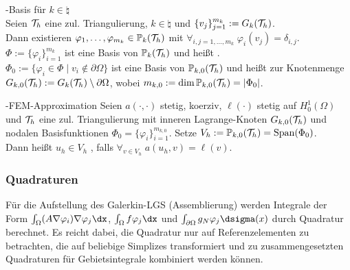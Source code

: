 \begin{Satz}{-Basis für $k \in \natural$}\\
    Seien $\mathcal{T}_h$ eine zul. Triangulierung, $k \in \natural$ und
    $\{v_j\}_{j=1}^{m_k} := G_k(\mathcal{T}_h)$.\\
    Dann existieren $\varphi_1, \dotsc, \varphi_{m_k} \in \mathbb{P}_k(\mathcal{T}_h)$
    mit $\forall_{i,j=1,\dotsc,m_k}\; \varphi_i(v_j) = \delta_{i,j}$.\\
    $\Phi := \{\varphi_i\}_{i=1}^{m_k}$ ist eine Basis von $\mathbb{P}_k(\mathcal{T}_h)$ und heißt
    .\\
    $\Phi_0 := \{\varphi_i \in \Phi \;|\; v_i \notin \partial\Omega\}$
    ist eine Basis von $\mathbb{P}_{k,0}(\mathcal{T}_h)$ und heißt
     zur Knotenmenge
    $G_{k,0}(\mathcal{T}_h) := G_k(\mathcal{T}_h) \setminus \partial\Omega$,
    wobei $m_{k,0} := \dim \mathbb{P}_{k,0}(\mathcal{T}_h) = |\Phi_0|$.
\end{Satz}

\begin{Def}{-FEM-Approximation}
    Seien $a(\cdot, \cdot)$ stetig, koerziv,
    $\ell(\cdot)$ stetig auf $H^1_0(\Omega)$ und
    $\mathcal{T}_h$ eine zul. Triangulierung mit inneren Lagrange-Knoten $G_{k,0}(\mathcal{T}_h)$
    und nodalen Basisfunktionen $\Phi_0 = \{\varphi_i\}_{i=1}^{m_{k,0}}$.
    Setze $V_h := \mathbb{P}_{k,0}(\mathcal{T}_h) = \operatorname{Span}(\Phi_0)$.\\
    Dann heißt $u_h \in V_h$ ,
    falls $\forall_{v \in V_h}\; a(u_h, v) = \ell(v)$.
\end{Def}

\pagebreak

\subsubsection{%
    Quadraturen%
}

\begin{Bem}
    Für die Aufstellung des Galerkin-LGS (Assemblierung) werden Integrale der Form
    $\int_\Omega (A\nabla \varphi_i) \nabla \varphi_j \dx$,
    $\int_\Omega f\varphi_j \dx$ und $\int_{\partial\Omega} g_N \varphi_j \dsigma(x)$
    durch Quadratur berechnet.
    Es reicht dabei, die Quadratur nur auf Referenzelementen zu betrachten,
    die auf beliebige Simplizes transformiert und zu zusammengesetzten
    Quadraturen für Gebietsintegrale kombiniert werden können.
\end{Bem}

